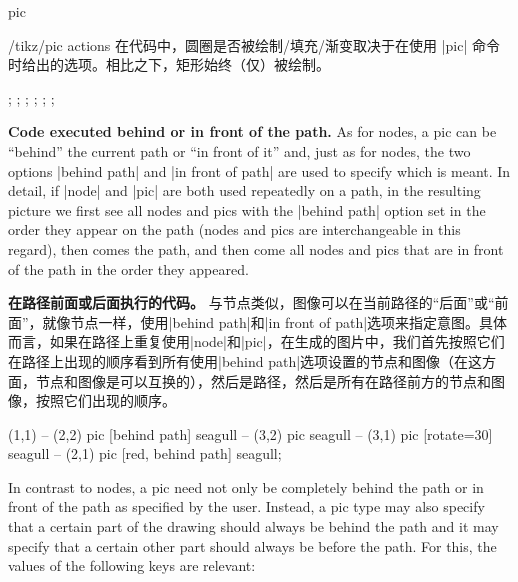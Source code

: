\begin{pathoperation}{pic}
\begin{key}{/tikz/pic actions}
        在代码中，圆圈是否被绘制/填充/渐变取决于在使用 |pic| 命令时给出的选项。相比之下，矩形始终（仅）被绘制。
\begin{codeexample}[
    width=6cm,
    pre={\tikzset{
  my pic/.pic = {
    \path [pic actions] (0,0) circle[radius=3mm];
    \draw (-3mm,-3mm) rectangle (3mm,3mm);
  }
}}]
\tikz {}; \space
\tikz {}; \space
\tikz {}; \space
\tikz {}; \space
\tikz {}; \space
\tikz {};
\end{codeexample}
    \end{key}

    \medskip
    \textbf{Code executed behind or in front of the path.}
    As for nodes, a pic can be ``behind'' the current path or ``in front of
    it'' and, just as for nodes, the two options |behind path| and
    |in front of path| are used to specify which is meant. In detail, if |node|
    and |pic| are both used repeatedly on a path, in the resulting picture we
    first see all nodes and pics with the |behind path| option set in the order
    they appear on the path (nodes and pics are interchangeable in this
    regard), then comes the path, and then come all nodes and pics that are in
    front of the path in the order they appeared.
    
    \textbf{在路径前面或后面执行的代码。}
与节点类似，图像可以在当前路径的“后面”或“前面”，就像节点一样，使用|behind path|和|in front of path|选项来指定意图。具体而言，如果在路径上重复使用|node|和|pic|，在生成的图片中，我们首先按照它们在路径上出现的顺序看到所有使用|behind path|选项设置的节点和图像（在这方面，节点和图像是可以互换的），然后是路径，然后是所有在路径前方的节点和图像，按照它们出现的顺序。
\begin{codeexample}[
    pre={\tikzset{
  seagull/.pic={
    \draw (-3mm,0) to [bend left] (0,0) to [bend left] (3mm,0);
  },
}}]
\tikz \fill [fill=blue!20]
     (1,1)
  -- (2,2) pic [behind path]      {seagull}
  -- (3,2) pic                    {seagull}
  -- (3,1) pic [rotate=30]        {seagull}
  -- (2,1) pic [red, behind path] {seagull};
\end{codeexample}
    In contrast to nodes, a pic need not only be completely behind the path or
    in front of the path as specified by the user. Instead, a pic type may also
    specify that a certain part of the drawing should always be behind the path
    and it may specify that a certain other part should always be before the
    path. For this, the values of the following keys are relevant:


\end{pathoperation}
